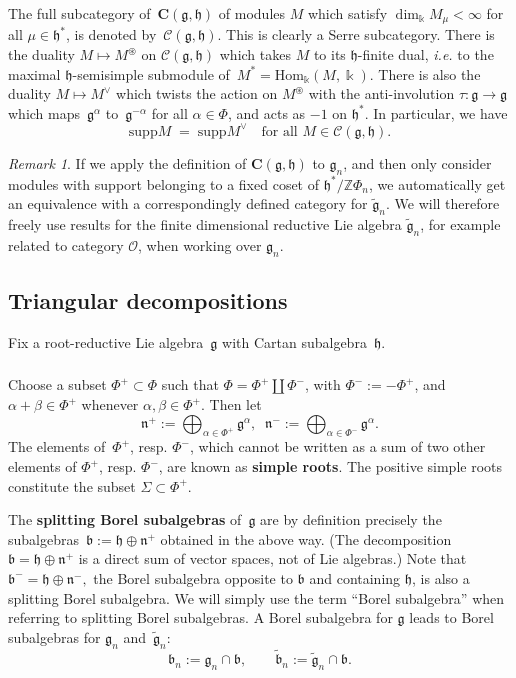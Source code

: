 \documentclass[11pt]{amsart}
\newcommand{\supp}{\mathrm{supp}}
\newcommand{\rR}{\Phi}
\newcommand{\cO}{\mathcal O}
\newcommand{\bC}{\mathbf{C}}
\newcommand{\Hom}{\mathrm{Hom}}
\newcommand{\mk}{\Bbbk}
\newcommand{\cC}{\mathcal{C}}
\newcommand{\fn}{\mathfrak{n}}
\newcommand{\fg}{\mathfrak{g}}
\newcommand{\fh}{\mathfrak{h}}
\newcommand{\fb}{\mathfrak{b}}
\newcommand{\mZ}{\mathbb{Z}}
\numberwithin{equation}{section}
\theoremstyle{plain}
\theoremstyle{remark}
\newtheorem{rem}[subsubsection]{Remark}
\theoremstyle{remark}
\theoremstyle{construction}
\begin{document}
The full subcategory of~$\bC(\fg,\fh)$ of modules $M$ which satisfy $\dim_{\mk}M_\mu<\infty$ for all $\mu\in\fh^\ast$, is denoted by~$\cC(\fg,\fh)$. This is clearly a Serre subcategory.
  {There is} the duality $M\mapsto M^{\circledast}$ on $\cC(\fg,\fh)$ which takes $M$ to its $\fh$-finite dual, {\it i.e.} to the maximal $\fh$-semisimple submodule of~$M^\ast=\Hom_{\mk}(M,\mk)$. {There is} also  the duality $M\mapsto M^{\vee}$ which twists the action on $M^{\circledast}$ with the {anti-involution $\tau:\fg\to\fg$} which maps~$\fg^{\alpha}$ to~$\fg^{-\alpha}$ for all $\alpha\in\Phi$, and acts as $-1$ on $\fh^\ast$. In particular, we have
  \begin{equation}
  \label{suppDual}
  \supp M\;=\;\supp M^\vee\quad\mbox{for all $M\in\cC(\fg,\fh).$}
  \end{equation}


\begin{rem}
If we apply the definition of $\bC(\fg,\fh)$ to $\fg_n$, and then only consider modules with support belonging to a fixed coset of $\fh^\ast/\mZ\rR_n$, we automatically get an equivalence with a correspondingly defined category for $\widetilde{\fg}_n$. We will therefore freely use results for the finite dimensional reductive Lie algebra $\widetilde{\fg}_n$, for example related to category $\cO$, when working over $\fg_n$.
\end{rem}




\subsection{Triangular decompositions} Fix a root-reductive Lie algebra~$\fg$ with Cartan subalgebra~$\fh$.




\subsubsection{}\label{DefBorel}Choose a subset $\rR^+\subset\rR$ such that $\rR=\rR^+\amalg\rR^-$, with $\rR^-:=-\rR^+$, and $\alpha+\beta\in\Phi^+$ whenever $\alpha,\beta\in\Phi^+$.
Then {let}
$$ \fn^+:=\bigoplus_{\alpha\in\rR^+}\fg^\alpha,\;\; \fn^-:=\bigoplus_{\alpha\in\rR^-}\fg^{\alpha}.$$
The elements of~$\rR^+$, resp. $\rR^-$, which cannot be written as a sum of two other elements of $\rR^+$, resp. $\Phi^-$, are known as {\bf simple roots}. The positive simple roots constitute the subset $\Sigma \subset\rR^+$. 

The {\bf splitting Borel subalgebras} of~$\fg$ are by definition precisely the subalgebras~$\fb:=\fh\oplus\fn^+$ obtained in the above way. (The decomposition $\fb=\fh\oplus\fn^+$ is a direct sum of vector spaces, not of Lie algebras.)
Note that~$\fb^-=\fh\oplus\fn^-,$ the  Borel subalgebra {opposite} to $\fb$ {and containing $\fh$}, is also a splitting Borel subalgebra. We will simply use the term ``Borel subalgebra'' when referring to splitting Borel subalgebras. A Borel subalgebra for $\fg$ leads to Borel subalgebras for $\fg_n$ and~$\widetilde{\fg}_n$:
$$\fb_n:=\fg_n\cap\fb,\qquad \widetilde{\fb}_n:=\widetilde{\fg}_n\cap\fb.$$
\end{document}
